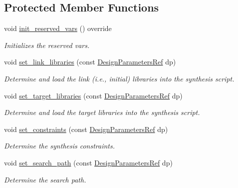 \subsection*{Protected Member Functions}
\begin{DoxyCompactItemize}
\item 
void \hyperlink{classDesignCompilerWrapper_ac1adc09c852d3103b975cf53240b36ea}{init\+\_\+reserved\+\_\+vars} () override
\begin{DoxyCompactList}\small\item\em Initializes the reserved vars. \end{DoxyCompactList}\item 
void \hyperlink{classDesignCompilerWrapper_ade11225e9d991c6dafea46b4e3f360f8}{set\+\_\+link\+\_\+libraries} (const \hyperlink{DesignParameters_8hpp_ae36bb1c4c9150d0eeecfe1f96f42d157}{Design\+Parameters\+Ref} dp)
\begin{DoxyCompactList}\small\item\em Determine and load the link (i.\+e., initial) libraries into the synthesis script. \end{DoxyCompactList}\item 
void \hyperlink{classDesignCompilerWrapper_adeb66be707eda10cd2fd96db1172f264}{set\+\_\+target\+\_\+libraries} (const \hyperlink{DesignParameters_8hpp_ae36bb1c4c9150d0eeecfe1f96f42d157}{Design\+Parameters\+Ref} dp)
\begin{DoxyCompactList}\small\item\em Determine and load the target libraries into the synthesis script. \end{DoxyCompactList}\item 
void \hyperlink{classDesignCompilerWrapper_ac3831bee787ce135313ec86b61b0f70e}{set\+\_\+constraints} (const \hyperlink{DesignParameters_8hpp_ae36bb1c4c9150d0eeecfe1f96f42d157}{Design\+Parameters\+Ref} dp)
\begin{DoxyCompactList}\small\item\em Determine the synthesis constraints. \end{DoxyCompactList}\item 
void \hyperlink{classDesignCompilerWrapper_abb0c8853b1684a038e02623521c8ac05}{set\+\_\+search\+\_\+path} (const \hyperlink{DesignParameters_8hpp_ae36bb1c4c9150d0eeecfe1f96f42d157}{Design\+Parameters\+Ref} dp)
\begin{DoxyCompactList}\small\item\em Determine the search path. \end{DoxyCompactList}\item 

\end{DoxyCompactItemize}
